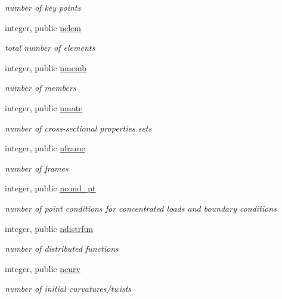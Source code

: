 \begin{DoxyCompactItemize}
\begin{DoxyCompactList}\small\item\em number of key points \end{DoxyCompactList}\item 
integer, public \hyperlink{namespaceioaero_a543ebf3623a96606d0956211621ce254}{nelem}
\begin{DoxyCompactList}\small\item\em total number of elements \end{DoxyCompactList}\item 
integer, public \hyperlink{namespaceioaero_ab59096c14b19d71fd53523822067402c}{nmemb}
\begin{DoxyCompactList}\small\item\em number of members \end{DoxyCompactList}\item 
integer, public \hyperlink{namespaceioaero_ad8817641275f11b821b7720a78651531}{nmate}
\begin{DoxyCompactList}\small\item\em number of cross-\/sectional properties sets \end{DoxyCompactList}\item 
integer, public \hyperlink{namespaceioaero_ac9fe2ddcc0797f81e7bc475a28692978}{nframe}
\begin{DoxyCompactList}\small\item\em number of frames \end{DoxyCompactList}\item 
integer, public \hyperlink{namespaceioaero_a5ffc5d3578d9abad99d3736ba352e07d}{ncond\+\_\+pt}
\begin{DoxyCompactList}\small\item\em number of point conditions for concentrated loads and boundary conditions \end{DoxyCompactList}\item 
integer, public \hyperlink{namespaceioaero_a89e1f8f2d6913d23ef482a5788d2eba5}{ndistrfun}
\begin{DoxyCompactList}\small\item\em number of distributed functions \end{DoxyCompactList}\item 
integer, public \hyperlink{namespaceioaero_a34dabcb4bc1b4f260277297856ac3653}{ncurv}
\begin{DoxyCompactList}\small\item\em number of initial curvatures/twists \end{DoxyCompactList}\item 

\end{DoxyCompactItemize}
